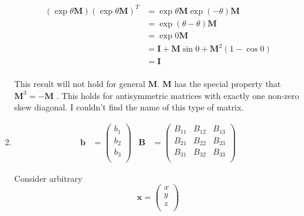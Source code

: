 \documentclass[10pt,oneside,a4paper]{article}
\begin{document}
\begin{enumerate}
\[
\begin{split}
(\exp\theta\mathbf{M})(\exp\theta\mathbf{M})^T &= \exp\theta\mathbf{M}\exp(-\theta)\mathbf{M} \\
                                                           &= \exp(\theta - \theta)\mathbf{M} \\
                                                           &= \exp0\mathbf{M} \\
                                                           &= \mathbf{I} + \mathbf{M}\sin 0 + \mathbf{M}^2(1 - \cos 0)\\
                                                           &= \mathbf{I} \\
\end{split}
\]

This result will not hold for general $\mathbf{M}$. $\mathbf{M}$ has the special property that
$\mathbf{M}^3 = -\mathbf{M}$ .
This holds for antisymmetric matrices with exactly one non-zero skew diagonal.
I couldn't find the name of this type of matrix.

\item 

\begin{align*}
\mathbf{b} &= \begin{pmatrix} b_1 \\ b_2 \\ b_3 \\ \end{pmatrix} & \mathbf{B} &= \begin{pmatrix} B_{11} & B_{12} & B_{13} \\ B_{21} & B_{22} & B_{23} \\ B_{31} & B_{32} & B_{33} \\ \end{pmatrix}
\end{align*}

Consider arbitrary
\[
\mathbf{x} = \begin{pmatrix} x \\ y \\ z \\ \end{pmatrix}
\]


\end{enumerate}
\end{document}

